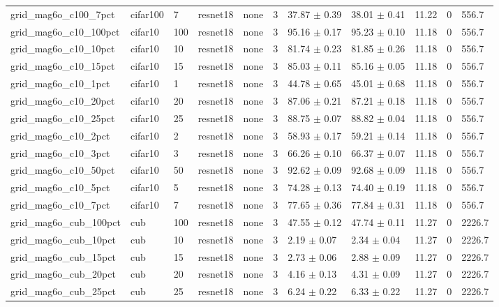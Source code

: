 \begin{tabular}{lllllllllll}
grid_mag6o_c100_7pct & cifar100 & 7 & resnet18 & none & 3 & 37.87 $\pm$ 0.39 & 38.01 $\pm$ 0.41 & 11.22 & 0 & 556.7 \\
grid_mag6o_c10_100pct & cifar10 & 100 & resnet18 & none & 3 & 95.16 $\pm$ 0.17 & 95.23 $\pm$ 0.10 & 11.18 & 0 & 556.7 \\
grid_mag6o_c10_10pct & cifar10 & 10 & resnet18 & none & 3 & 81.74 $\pm$ 0.23 & 81.85 $\pm$ 0.26 & 11.18 & 0 & 556.7 \\
grid_mag6o_c10_15pct & cifar10 & 15 & resnet18 & none & 3 & 85.03 $\pm$ 0.11 & 85.16 $\pm$ 0.05 & 11.18 & 0 & 556.7 \\
grid_mag6o_c10_1pct & cifar10 & 1 & resnet18 & none & 3 & 44.78 $\pm$ 0.65 & 45.01 $\pm$ 0.68 & 11.18 & 0 & 556.7 \\
grid_mag6o_c10_20pct & cifar10 & 20 & resnet18 & none & 3 & 87.06 $\pm$ 0.21 & 87.21 $\pm$ 0.18 & 11.18 & 0 & 556.7 \\
grid_mag6o_c10_25pct & cifar10 & 25 & resnet18 & none & 3 & 88.75 $\pm$ 0.07 & 88.82 $\pm$ 0.04 & 11.18 & 0 & 556.7 \\
grid_mag6o_c10_2pct & cifar10 & 2 & resnet18 & none & 3 & 58.93 $\pm$ 0.17 & 59.21 $\pm$ 0.14 & 11.18 & 0 & 556.7 \\
grid_mag6o_c10_3pct & cifar10 & 3 & resnet18 & none & 3 & 66.26 $\pm$ 0.10 & 66.37 $\pm$ 0.07 & 11.18 & 0 & 556.7 \\
grid_mag6o_c10_50pct & cifar10 & 50 & resnet18 & none & 3 & 92.62 $\pm$ 0.09 & 92.68 $\pm$ 0.09 & 11.18 & 0 & 556.7 \\
grid_mag6o_c10_5pct & cifar10 & 5 & resnet18 & none & 3 & 74.28 $\pm$ 0.13 & 74.40 $\pm$ 0.19 & 11.18 & 0 & 556.7 \\
grid_mag6o_c10_7pct & cifar10 & 7 & resnet18 & none & 3 & 77.65 $\pm$ 0.36 & 77.84 $\pm$ 0.31 & 11.18 & 0 & 556.7 \\
grid_mag6o_cub_100pct & cub & 100 & resnet18 & none & 3 & 47.55 $\pm$ 0.12 & 47.74 $\pm$ 0.11 & 11.27 & 0 & 2226.7 \\
grid_mag6o_cub_10pct & cub & 10 & resnet18 & none & 3 & 2.19 $\pm$ 0.07 & 2.34 $\pm$ 0.04 & 11.27 & 0 & 2226.7 \\
grid_mag6o_cub_15pct & cub & 15 & resnet18 & none & 3 & 2.73 $\pm$ 0.06 & 2.88 $\pm$ 0.09 & 11.27 & 0 & 2226.7 \\
grid_mag6o_cub_20pct & cub & 20 & resnet18 & none & 3 & 4.16 $\pm$ 0.13 & 4.31 $\pm$ 0.09 & 11.27 & 0 & 2226.7 \\
grid_mag6o_cub_25pct & cub & 25 & resnet18 & none & 3 & 6.24 $\pm$ 0.22 & 6.33 $\pm$ 0.22 & 11.27 & 0 & 2226.7 \\

\end{tabular}
